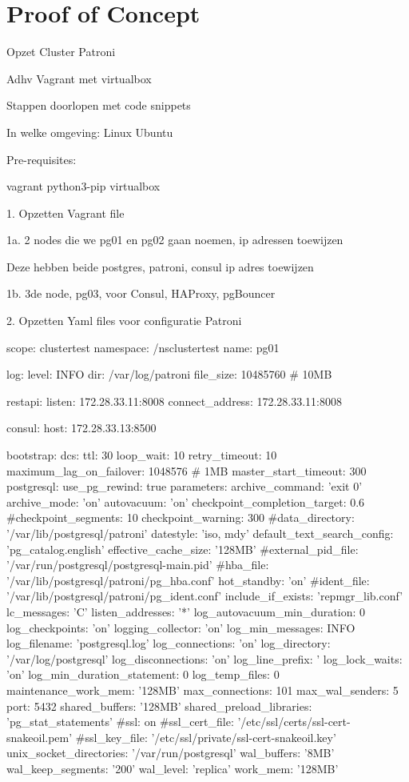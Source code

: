 
\chapter{Proof of Concept}

\label{ch:Proof of Concept}



Opzet Cluster Patroni

Adhv Vagrant met virtualbox

Stappen doorlopen met code snippets

In welke omgeving: Linux Ubuntu

Pre-requisites:

vagrant
python3-pip
virtualbox


1. Opzetten Vagrant file

1a. 2 nodes die we pg01 en pg02 gaan noemen, ip adressen toewijzen

Deze hebben beide postgres, patroni, consul
ip adres toewijzen

1b. 3de node, pg03, voor Consul, HAProxy, pgBouncer


2. Opzetten Yaml files voor configuratie Patroni

scope: clustertest
namespace: /nsclustertest
name: pg01

log:
level: INFO
dir: /var/log/patroni
file_size: 10485760 # 10MB

restapi:
listen: 172.28.33.11:8008
connect_address: 172.28.33.11:8008

consul:
host: 172.28.33.13:8500

bootstrap:
dcs:
ttl: 30
loop_wait: 10
retry_timeout: 10
maximum_lag_on_failover: 1048576 # 1MB
master_start_timeout: 300
postgresql:
use_pg_rewind: true
parameters:
archive_command: 'exit 0'
archive_mode: 'on'
autovacuum: 'on'
checkpoint_completion_target: 0.6
#checkpoint_segments: 10
checkpoint_warning: 300
#data_directory: '/var/lib/postgresql/patroni'
datestyle: 'iso, mdy'
default_text_search_config: 'pg_catalog.english'
effective_cache_size: '128MB'
#external_pid_file: '/var/run/postgresql/postgresql-main.pid'
#hba_file: '/var/lib/postgresql/patroni/pg_hba.conf'
hot_standby: 'on'
#ident_file: '/var/lib/postgresql/patroni/pg_ident.conf'
include_if_exists: 'repmgr_lib.conf'
lc_messages: 'C'
listen_addresses: '*'
log_autovacuum_min_duration: 0
log_checkpoints: 'on'
logging_collector: 'on'
log_min_messages: INFO
log_filename: 'postgresql.log'
log_connections: 'on'
log_directory: '/var/log/postgresql'
log_disconnections: 'on'
log_line_prefix: '%
log_lock_waits: 'on'
log_min_duration_statement: 0
log_temp_files: 0
maintenance_work_mem: '128MB'
max_connections: 101
max_wal_senders: 5
port: 5432
shared_buffers: '128MB'
shared_preload_libraries: 'pg_stat_statements'
#ssl: on
#ssl_cert_file: '/etc/ssl/certs/ssl-cert-snakeoil.pem'
#ssl_key_file: '/etc/ssl/private/ssl-cert-snakeoil.key'
unix_socket_directories: '/var/run/postgresql'
wal_buffers: '8MB'
wal_keep_segments: '200'
wal_level: 'replica'
work_mem: '128MB'

